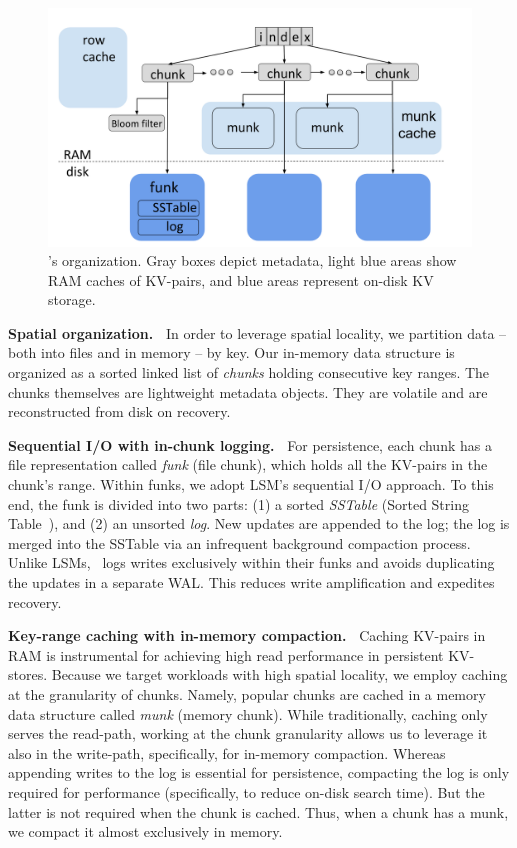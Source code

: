 \begin{figure}[tb]
\includegraphics[width=\columnwidth]{PiWi.png}
\caption{\sys's  organization. Gray boxes depict metadata, light blue areas show RAM caches of KV-pairs, and blue areas represent on-disk KV storage.}
\label{fig:piwi}
\end{figure}


{\bf Spatial organization.\ }
In order to leverage spatial locality, we partition data -- both into files and in memory -- by key.
Our in-memory data structure is organized as a sorted linked list of \emph{chunks} holding consecutive key ranges.
The chunks themselves are lightweight metadata objects. They are volatile and are reconstructed from disk on recovery.

{\bf Sequential I/O with in-chunk logging.\ }
For persistence, each chunk has a file representation called  \emph{funk} (file chunk), which holds all the KV-pairs in the chunk's range.
Within funks, we adopt LSM's sequential I/O approach. To this end, the funk 
is divided into two parts: (1) a sorted \emph{SSTable} (Sorted String Table~\cite{Bigtable2008}), and (2) an unsorted \emph{log}. 
New updates are appended to the log; the log is  merged into the SSTable via an infrequent background compaction process. 
Unlike LSMs, \sys\ logs writes exclusively within their funks and avoids duplicating the updates  in a separate WAL. This reduces write amplification and expedites recovery. 

{\bf Key-range caching with in-memory compaction.\ }
Caching KV-pairs in RAM is instrumental for achieving high read performance in persistent KV-stores. 
Because we target workloads with high spatial locality, we employ caching at the granularity of chunks.
Namely, popular chunks are cached in a  memory data structure called \emph{munk} (memory chunk).
While traditionally, caching  only serves the read-path, working at the chunk granularity allows us to 
leverage it also in the write-path, specifically, for in-memory compaction.  Whereas appending writes to 
the log is essential for persistence, compacting the log is only required for performance (specifically, to 
reduce on-disk search time). But the latter is not required when the chunk is cached. Thus, when 
a chunk has a munk, we compact it almost exclusively in memory. 

